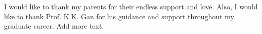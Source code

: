 \begin{acknowledgements}
I would like to thank my parents for their endless support and love. Also, I would like to thank Prof. K.K. Gan for his guidance and support throughout my graduate career. Add more text.
\end{acknowledgements}

